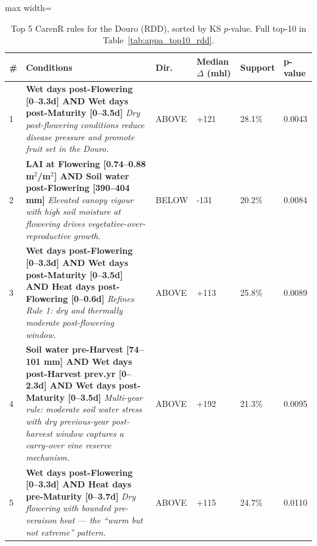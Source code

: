 \begin{table}[!ht]
  \centering
  \caption{Top 5 CarenR rules for the Douro (RDD), sorted by KS $p$-value. Full top-10 in Table~\ref{tab:appa_top10_rdd}.}\label{tab:ch4a_1}
  \small
  \begin{adjustbox}{max width=\textwidth}
    \begin{tabularx}{\textwidth}{p{0.4cm}|X|>{\centering\arraybackslash}p{0.9cm}|p{1.3cm}|p{1.2cm}|p{1.2cm}}
  \toprule
  \# & Conditions & Dir. & Median $\Delta$ \newline (mhl) & Support & p-value \\
  \midrule
  1 & \textbf{Wet days post-Flowering [0--3.3d] AND Wet days post-Maturity [0--3.5d]} \newline \textit{Dry post-flowering conditions reduce disease pressure and promote fruit set in the Douro.} & {\footnotesize ABOVE} & +121 & 28.1\% & 0.0043 \\
  2 & \textbf{LAI at Flowering [0.74--0.88 m$^2$/m$^2$] AND Soil water post-Flowering [390--404 mm]} \newline \textit{Elevated canopy vigour with high soil moisture at flowering drives vegetative-over-reproductive growth.} & {\footnotesize BELOW} & -131 & 20.2\% & 0.0084 \\
  3 & \textbf{Wet days post-Flowering [0--3.3d] AND Wet days post-Maturity [0--3.5d] AND Heat days post-Flowering [0--0.6d]} \newline \textit{Refines Rule 1: dry and thermally moderate post-flowering window.} & {\footnotesize ABOVE} & +113 & 25.8\% & 0.0089 \\
  4 & \textbf{Soil water pre-Harvest [74--101 mm] AND Wet days post-Harvest prev.yr [0--2.3d] AND Wet days post-Maturity [0--3.5d]} \newline \textit{Multi-year rule: moderate soil water stress with dry previous-year post-harvest window captures a carry-over vine reserve mechanism.} & {\footnotesize ABOVE} & +192 & 21.3\% & 0.0095 \\
  5 & \textbf{Wet days post-Flowering [0--3.3d] AND Heat days pre-Maturity [0--3.7d]} \newline \textit{Dry flowering with bounded pre-veraison heat — the ``warm but not extreme'' pattern.} & {\footnotesize ABOVE} & +115 & 24.7\% & 0.0110 \\
  \bottomrule
\end{tabularx}
  \end{adjustbox}

\end{table}


